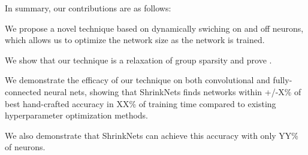 In summary, our contributions are as follows: 
\begin{compactenum}
\item We propose a novel technique based on dynamically swiching on and off neurons, 
which allows us to optimize the network size as the network is trained. 
\item We show that our technique is a relaxation of group sparsity and 
prove . 
\item {}
\item We demonstrate the efficacy of our technique on both convolutional and fully-connected neural nets,
showing that 
ShrinkNets finds networks within +/-X\% of best hand-crafted accuracy in XX\% of
training time compared to existing hyperparameter optimization methods.
\item We also demonstrate that ShrinkNets can achieve this accuracy with only YY\% 
of neurons.
\item {}
\item {}
\end{compactenum}
